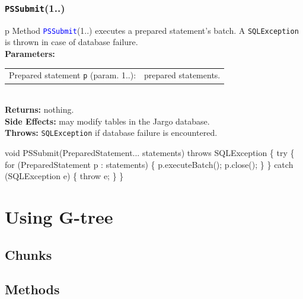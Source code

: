 \subsection{\texttt{PSSubmit}(1..)}
\begin{tabular}{p{\textwidth}}
\toprule
{}
Method \textcolor{blue}{{\tt{}\protect{}PSSubmit}}(1..) executes a prepared statement's batch.
A {\tt{}SQLException} is thrown in case of database failure.\\
\midrule
\textbf{Parameters:} \\
\begin{tabular}{lp{116mm}}
Prepared statement {\tt{}p} (param. 1..):&prepared statements.
\end{tabular}\\
\textbf{Returns:} nothing.\\
\textbf{Side Effects:} may modify tables in the Jargo database.\\
\textbf{Throws:} {\tt{}SQLException} if database failure is encountered.\\
\bottomrule
\end{tabular}
\nwenddocs{}\endmoddef{}
void PSSubmit(PreparedStatement... statements) throws SQLException \{
  try \{
    for (PreparedStatement p : statements) \{
      p.executeBatch();
      p.close();
    \}
  \} catch (SQLException e) \{
    throw e;
  \}
\}
\eatline
{}\nwendcode{}\nwdocspar
\nwenddocs{}\chapter{Using G-tree}
\label{gtree}

\section{Chunks}

\section{Methods}

